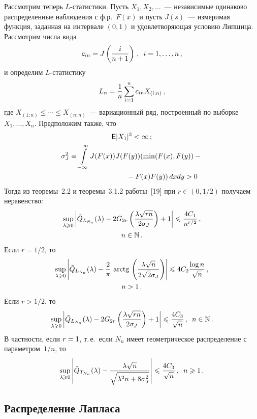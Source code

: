 \begin{multicols}{2}
Рассмотрим теперь $L$-статистики. Пусть $X_1,X_2,\ldots$~---
независимые одинаково распределенные наблюдения с ф.р.~$F(x)$ и
пусть $J(s)$~--- измеримая функция, заданная на интервале $(0,1)$  и
удовлетворяющая условию Липшица. Рассмотрим числа вида
$$
c_{in}=J\left(\displaystyle\frac{\displaystyle i\mathstrut}{\displaystyle n+1\mathstrut}\right)\,,\enskip i=1,\ldots,n\,,
$$
и определим  $L$-статистику
$$
L_n=\displaystyle\frac{\displaystyle 1\mathstrut}{\displaystyle n\mathstrut}\sum\limits_{i=1}^nc_{in}X_{(i:n)}\,,
$$
где $X_{(1:n)}\leqslant \cdots\leqslant  X_{(n:n)}$~--- вариационный ряд,
построенный по выборке $X_1,\ldots,X_n$. Предположим также, что
\begin{gather*}
{\sf E}|X_1|^3<\infty\,;\\
 \sigma^2_J\equiv
\int\limits_{-\infty}^{\infty}J(F(x))J(F(y))(\min(F(x),F(y))-{}\\
\hspace*{30mm}{}-F(x)F(y))\,dxdy>0
\end{gather*}
Тогда из теоремы~2.2 и теоремы~3.1.2 работы~[19] при
$r\in(0,1/2)$ получаем неравенство:
\begin{multline*}
\sup\limits_{\lambda\geqslant 0}\left\vert\tilde Q_{L_{N_n}}(\lambda)-
2G_{2r}\left(\displaystyle\frac{\displaystyle \lambda\sqrt{rn}\mathstrut}{\displaystyle 2\sigma_J\mathstrut}\right)+1\right\vert\leqslant
\frac{4C_1}{n^{r/2}}\,,\\ n\in\mathbb N\,.
\end{multline*}
Если $r=1/2$, то
\begin{multline*}
\sup\limits_{\lambda\geqslant 0}\left\vert\tilde Q_{L_{N_n}}(\lambda)-
\displaystyle\frac{\displaystyle 2\mathstrut}{\displaystyle \pi\mathstrut}\,\,\mathrm{arctg}\,\left(\displaystyle\frac{\displaystyle \lambda\sqrt
n\mathstrut}{\displaystyle 2\sqrt{2}\sigma_J\mathstrut}\right)\right\vert\leqslant 4C_2\displaystyle\frac{\displaystyle \log n\mathstrut}{\displaystyle \sqrt{n}\mathstrut}\,,\\
n> 1\,.
\end{multline*}
Если $r>1/2$, то
$$
\sup\limits_{\lambda\geqslant 0}\left\vert\tilde Q_{L_{N_n}}(\lambda)-
2G_{2r}\left(\displaystyle\frac{\displaystyle \lambda\sqrt{rn}\mathstrut}{\displaystyle 2\sigma_J\mathstrut}\right)+1\right\vert\leqslant
\displaystyle\frac{\displaystyle 4C_3\mathstrut}{\displaystyle \sqrt{n}\mathstrut}\,,\enskip n\in\mathbb N\,.
$$
В частности, если $r\hm=1$, т.\,е.\ если $N_n$ имеет гео\-мет\-ри\-че\-ское
распределение с параметром~$1/n$, то
$$
\sup\limits_{\lambda\geqslant 0}\left\vert\tilde Q_{T_{N_n}}(\lambda)-
\displaystyle\frac{\displaystyle \lambda\sqrt{n}\mathstrut}{\displaystyle \sqrt{\lambda^2n+8\sigma^2_J}\mathstrut}\right\vert\leqslant
\displaystyle\frac{\displaystyle 4C_3\mathstrut}{\displaystyle \sqrt{n}\mathstrut}\,,\enskip n\geqslant1\,.
$$

\smallskip

\subsection{Распределение Лапласа}


\end{multicols}
